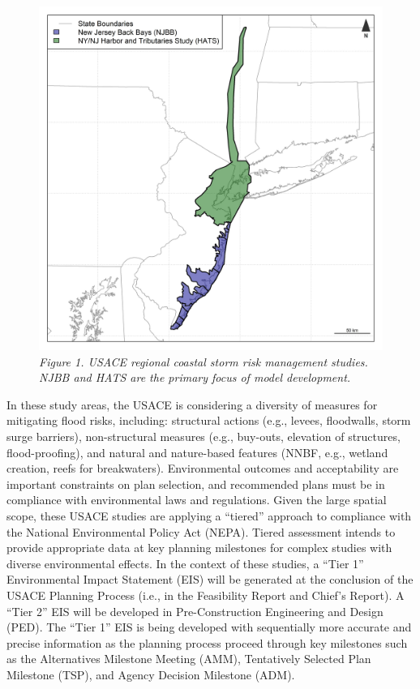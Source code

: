 \documentclass[
]{book}
\begin{document}
\begin{figure}
\centering
\includegraphics{ZZ_Fig01_USACE.Studies.jpeg}
\caption{\emph{Figure 1. USACE regional coastal storm risk management studies. NJBB and HATS are the primary focus of model development.}}
\end{figure}

In these study areas, the USACE is considering a diversity of measures for mitigating flood risks, including: structural actions (e.g., levees, floodwalls, storm surge barriers), non-structural measures (e.g., buy-outs, elevation of structures, flood-proofing), and natural and nature-based features (NNBF, e.g., wetland creation, reefs for breakwaters). Environmental outcomes and acceptability are important constraints on plan selection, and recommended plans must be in compliance with environmental laws and regulations. Given the large spatial scope, these USACE studies are applying a ``tiered'' approach to compliance with the National Environmental Policy Act (NEPA). Tiered assessment intends to provide appropriate data at key planning milestones for complex studies with diverse environmental effects. In the context of these studies, a ``Tier 1'' Environmental Impact Statement (EIS) will be generated at the conclusion of the USACE Planning Process (i.e., in the Feasibility Report and Chief's Report). A ``Tier 2'' EIS will be developed in Pre-Construction Engineering and Design (PED). The ``Tier 1'' EIS is being developed with sequentially more accurate and precise information as the planning process proceed through key milestones such as the Alternatives Milestone Meeting (AMM), Tentatively Selected Plan Milestone (TSP), and Agency Decision Milestone (ADM).
\end{document}
